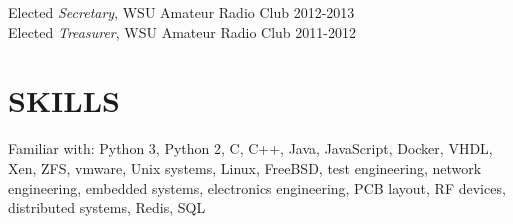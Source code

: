 \documentclass[line, margin]{res}
\begin{document}
\begin{resume}
\begin{position}
            Elected {\it Secretary}, WSU Amateur Radio Club \hfill 2012-2013\\
            Elected {\it Treasurer}, WSU Amateur Radio Club \hfill 2011-2012
\end{position}
\section{SKILLS}
Familiar with: Python 3, Python 2, C, C++, Java, JavaScript, Docker, VHDL, 
Xen, ZFS, vmware, Unix systems, Linux, FreeBSD, test engineering, network 
engineering, embedded systems, electronics engineering, PCB layout, RF devices,
distributed systems, Redis, SQL

\end{resume}
\end{document}
